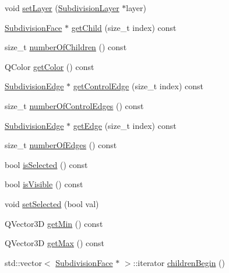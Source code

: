 \begin{DoxyCompactItemize}
\item 
void \hyperlink{classShipCAD_1_1SubdivisionControlFace_a23631dfffd1c3ad7fc59537a4684fa01}{set\+Layer} (\hyperlink{classShipCAD_1_1SubdivisionLayer}{Subdivision\+Layer} $\ast$layer)
\item 
\hyperlink{classShipCAD_1_1SubdivisionFace}{Subdivision\+Face} $\ast$ \hyperlink{classShipCAD_1_1SubdivisionControlFace_a6f015666ee5e626ce3aed4973f8d12a7}{get\+Child} (size\+\_\+t index) const 
\item 
size\+\_\+t \hyperlink{classShipCAD_1_1SubdivisionControlFace_a6a79fec036f3d7d52214a280e878a038}{number\+Of\+Children} () const 
\item 
Q\+Color \hyperlink{classShipCAD_1_1SubdivisionControlFace_aeb5f1cae973351f841a79fa23fc98f0d}{get\+Color} () const 
\item 
\hyperlink{classShipCAD_1_1SubdivisionEdge}{Subdivision\+Edge} $\ast$ \hyperlink{classShipCAD_1_1SubdivisionControlFace_a5c149807dc5891e23b463c4251e707f5}{get\+Control\+Edge} (size\+\_\+t index) const 
\item 
size\+\_\+t \hyperlink{classShipCAD_1_1SubdivisionControlFace_a3f2351019487ed20295fa8c7995b9416}{number\+Of\+Control\+Edges} () const 
\item 
\hyperlink{classShipCAD_1_1SubdivisionEdge}{Subdivision\+Edge} $\ast$ \hyperlink{classShipCAD_1_1SubdivisionControlFace_a4e082cc36a24c3bed2e163741e29cb25}{get\+Edge} (size\+\_\+t index) const 
\item 
size\+\_\+t \hyperlink{classShipCAD_1_1SubdivisionControlFace_a1c11d167b9efa21ed6c0a98ca15725f1}{number\+Of\+Edges} () const 
\item 
bool \hyperlink{classShipCAD_1_1SubdivisionControlFace_aeb3b4efb341ea48023e076e8956650ff}{is\+Selected} () const 
\item 
bool \hyperlink{classShipCAD_1_1SubdivisionControlFace_ab6e5d8b0abf8811fabf3767e5b5c5602}{is\+Visible} () const 
\item 
void \hyperlink{classShipCAD_1_1SubdivisionControlFace_a2ce580378cd200faec6a24d9d794c68e}{set\+Selected} (bool val)
\item 
Q\+Vector3D \hyperlink{classShipCAD_1_1SubdivisionControlFace_a9e205ab09b4660ab2b5377afaa620cd6}{get\+Min} () const 
\item 
Q\+Vector3D \hyperlink{classShipCAD_1_1SubdivisionControlFace_a58ee183f9aef669fe96ccf36789999c2}{get\+Max} () const 
\item 
std\+::vector$<$ \hyperlink{classShipCAD_1_1SubdivisionFace}{Subdivision\+Face} $\ast$ $>$\+::iterator \hyperlink{classShipCAD_1_1SubdivisionControlFace_ad20ed50df8ddd91c4aa04eb482ab0fa0}{children\+Begin} ()

\end{DoxyCompactItemize}
